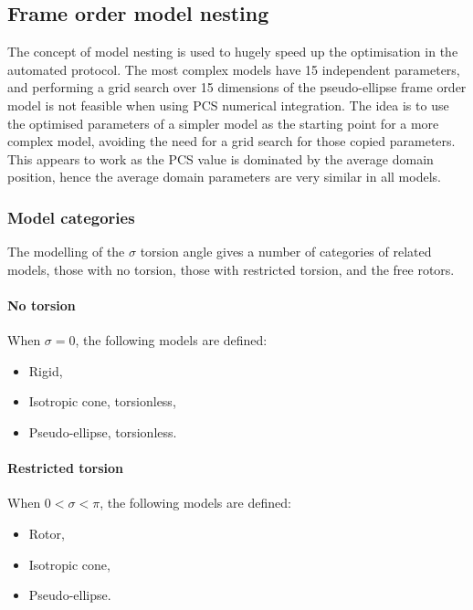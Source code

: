 
\subsection{Frame order model nesting}

The concept of model nesting is used to hugely speed up the optimisation in the automated protocol.
The most complex models have 15 independent parameters, and performing a grid search over 15 dimensions of the pseudo-ellipse frame order model is not feasible when using PCS numerical integration.
The idea is to use the optimised parameters of a simpler model as the starting point for a more complex model, avoiding the need for a grid search for those copied parameters.
This appears to work as the PCS value is dominated by the average domain position, hence the average domain parameters are very similar in all models.


\subsubsection{Model categories}

The modelling of the $\sigma$ torsion angle gives a number of categories of related models, those with no torsion, those with restricted torsion, and the free rotors.


\paragraph{No torsion}

When $\sigma = 0$, the following models are defined:
\begin{itemize}
    \item Rigid,
    \item Isotropic cone, torsionless,
    \item Pseudo-ellipse, torsionless.
\end{itemize}


\paragraph{Restricted torsion}

When $0 < \sigma < \pi$, the following models are defined:
\begin{itemize}
    \item Rotor,
    \item Isotropic cone,
    \item Pseudo-ellipse.
\end{itemize}



